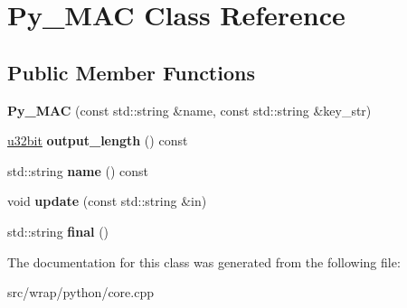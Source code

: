 \hypertarget{classPy__MAC}{\section{Py\-\_\-\-M\-A\-C Class Reference}
\label{classPy__MAC}
}
\subsection*{Public Member Functions}
\begin{DoxyCompactItemize}
\item 
\hypertarget{classPy__MAC_a457e4735d3e5815ec9a77d7b5575b347}{{\bfseries Py\-\_\-\-M\-A\-C} (const std\-::string \&name, const std\-::string \&key\-\_\-str)}\label{classPy__MAC_a457e4735d3e5815ec9a77d7b5575b347}

\item 
\hypertarget{classPy__MAC_a9c14aa2d21d48c02c27381a648353c39}{\hyperlink{namespaceBotan_aacc7d03c95e97e76168fc1c819031830}{u32bit} {\bfseries output\-\_\-length} () const }\label{classPy__MAC_a9c14aa2d21d48c02c27381a648353c39}

\item 
\hypertarget{classPy__MAC_a4cbd800cdc20b90dfb6e572da320a0f9}{std\-::string {\bfseries name} () const }\label{classPy__MAC_a4cbd800cdc20b90dfb6e572da320a0f9}

\item 
\hypertarget{classPy__MAC_a51a350ca49373feb9a6fce0cc2d28fac}{void {\bfseries update} (const std\-::string \&in)}\label{classPy__MAC_a51a350ca49373feb9a6fce0cc2d28fac}

\item 
\hypertarget{classPy__MAC_a4e4d4440694cfaac823196989d42af20}{std\-::string {\bfseries final} ()}\label{classPy__MAC_a4e4d4440694cfaac823196989d42af20}

\end{DoxyCompactItemize}


The documentation for this class was generated from the following file\-:\begin{DoxyCompactItemize}
\item 
src/wrap/python/core.\-cpp\end{DoxyCompactItemize}

